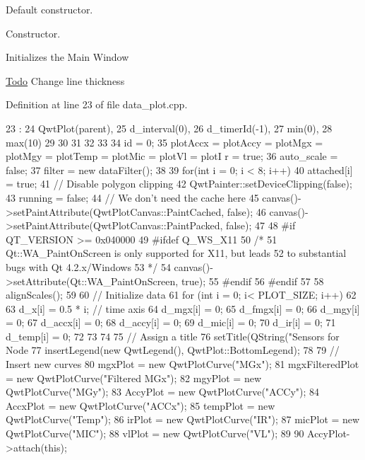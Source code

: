 Default constructor. 

Constructor.

Initializes the Main Window 

\begin{Desc}
\item[\hyperlink{todo__todo000001}{Todo}]Change line thickness \end{Desc}




Definition at line 23 of file data\_\-plot.cpp.




\begin{DoxyCode}
23                                  :
24     QwtPlot(parent),
25     d_interval(0),
26     d_timerId(-1),
27     min(0),
28     max(10)
29 
30 
31 
32 {
33 
34     id = 0;
35     plotAccx = plotAccy = plotMgx = plotMgy = plotTemp = plotMic = plotVl = plotI
      r = true;
36     auto_scale = false;
37     filter = new dataFilter();
38 
39     for(int i = 0; i < 8; i++)
40         attached[i] = true;
41     // Disable polygon clipping
42     QwtPainter::setDeviceClipping(false);
43     running = false;
44     // We don't need the cache here
45     canvas()->setPaintAttribute(QwtPlotCanvas::PaintCached, false);
46     canvas()->setPaintAttribute(QwtPlotCanvas::PaintPacked, false);
47 
48 #if QT_VERSION >= 0x040000
49 #ifdef Q_WS_X11
50     /*
51        Qt::WA_PaintOnScreen is only supported for X11, but leads
52        to substantial bugs with Qt 4.2.x/Windows
53      */
54     canvas()->setAttribute(Qt::WA_PaintOnScreen, true);
55 #endif
56 #endif
57 
58     alignScales();
59     
60     //  Initialize data
61     for (int i = 0; i< PLOT_SIZE; i++)
62     {
63         d_x[i] = 0.5 * i;     // time axis
64         d_mgx[i] = 0;
65         d_fmgx[i] = 0;
66         d_mgy[i] = 0;
67         d_accx[i] = 0;
68         d_accy[i] = 0;
69         d_mic[i] = 0;
70         d_ir[i] = 0;
71         d_temp[i] = 0;
72     }
73 
74 
75     // Assign a title
76     setTitle(QString("Sensors for Node %
77     insertLegend(new QwtLegend(), QwtPlot::BottomLegend);
78 
79     // Insert new curves
80     mgxPlot = new QwtPlotCurve("MGx");
81     mgxFilteredPlot = new QwtPlotCurve("Filtered MGx");
82     mgyPlot = new QwtPlotCurve("MGy");
83     AccyPlot = new QwtPlotCurve("ACCy");
84     AccxPlot = new QwtPlotCurve("ACCx");
85     tempPlot = new QwtPlotCurve("Temp");
86     irPlot = new QwtPlotCurve("IR");
87     micPlot = new QwtPlotCurve("MIC");
88     vlPlot = new QwtPlotCurve("VL");
89 
90     AccyPlot->attach(this);
}
\end{DoxyCode}
